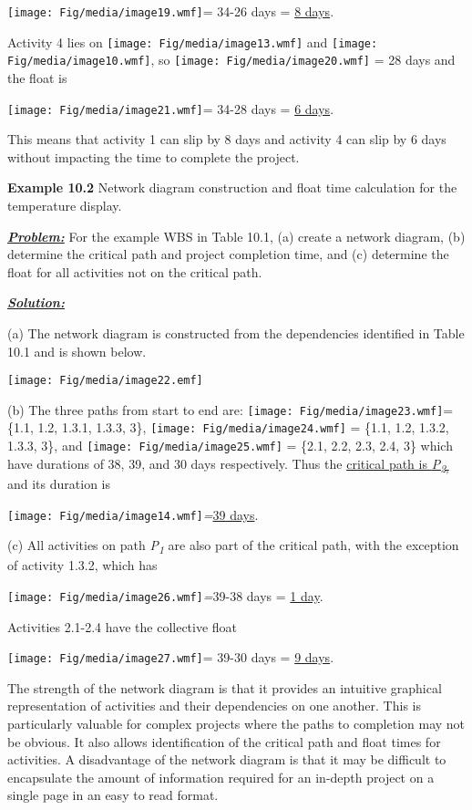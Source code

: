 \texttt{[image: Fig/media/image19.wmf]}=
34-26 days = \ul{8 days}.

Activity 4 lies on
\texttt{[image: Fig/media/image13.wmf]}
and
\texttt{[image: Fig/media/image10.wmf]},
so \texttt{[image: Fig/media/image20.wmf]} = 28 days and the float is

\texttt{[image: Fig/media/image21.wmf]}= 34-28 days = \ul{6 days}.

This means that activity 1 can slip by 8 days and activity 4 can slip by
6 days without impacting the time to complete the project.

\textbf{Example 10.2} Network diagram construction and float time
calculation for the temperature display.

\emph{\textbf{\ul{Problem:}}} For the example WBS in Table 10.1, (a)
create a network diagram, (b) determine the critical path and project
completion time, and (c) determine the float for all activities not on
the critical path.

\textbf{\ul{\emph{Solution:}}}

(a) The network diagram is constructed from the dependencies identified
in Table 10.1 and is shown below.

\texttt{[image: Fig/media/image22.emf]}

(b) The three paths from start to end are:
\texttt{[image: Fig/media/image23.wmf]}= \{1.1, 1.2, 1.3.1, 1.3.3, 3\},
\texttt{[image: Fig/media/image24.wmf]} = \{1.1, 1.2, 1.3.2, 1.3.3, 3\},
and \texttt{[image: Fig/media/image25.wmf]} = \{2.1, 2.2, 2.3, 2.4, 3\}
which have durations of 38, 39, and 30 days respectively. Thus the
\ul{critical path is \emph{P\textsubscript{2,}}} and its duration is

\texttt{[image: Fig/media/image14.wmf]}\emph{=}\ul{39
days}.

(c) All activities on path \emph{P\textsubscript{1}} are also part of
the critical path, with the exception of activity 1.3.2, which has

\texttt{[image: Fig/media/image26.wmf]}\emph{=}39-38 days = \ul{1 day}.

Activities 2.1-2.4 have the collective float

\texttt{[image: Fig/media/image27.wmf]}= 39-30 days = \ul{9 days}.

The strength of the network diagram is that it provides an intuitive
graphical representation of activities and their dependencies on one
another. This is particularly valuable for complex projects where the
paths to completion may not be obvious. It also allows identification of
the critical path and float times for activities. A disadvantage of the
network diagram is that it may be difficult to encapsulate the amount of
information required for an in-depth project on a single page in an easy
to read format.

